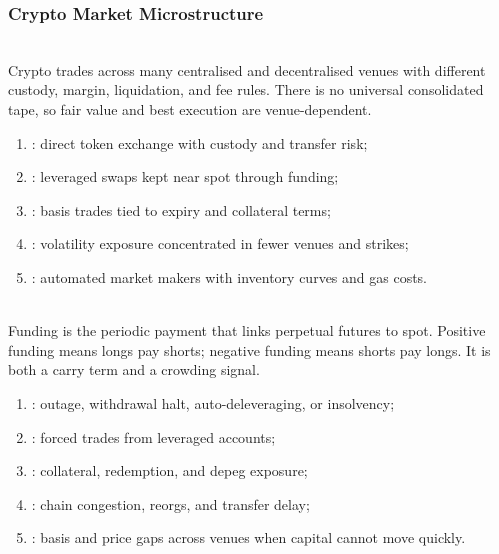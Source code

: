 \subsubsection{Crypto Market Microstructure}

\begin{principle} \\
Crypto trades across many centralised and decentralised venues with different custody, margin, liquidation, and fee rules. There is no universal consolidated tape, so fair value and best execution are venue-dependent.
\end{principle}

\begin{taxonomy} 
\begin{enumerate}[label=\roman*.]
\setlength{\itemsep}{0pt}
\item {}: direct token exchange with custody and transfer risk;
\item {}: leveraged swaps kept near spot through funding;
\item {}: basis trades tied to expiry and collateral terms;
\item {}: volatility exposure concentrated in fewer venues and strikes;
\item {}: automated market makers with inventory curves and gas costs.
\end{enumerate}
\end{taxonomy}

\begin{definition} \\
Funding is the periodic payment that links perpetual futures to spot. Positive funding means longs pay shorts; negative funding means shorts pay longs. It is both a carry term and a crowding signal.
\end{definition}

\begin{taxonomy} 
\begin{enumerate}[label=\roman*.]
\setlength{\itemsep}{0pt}
\item {}: outage, withdrawal halt, auto-deleveraging, or insolvency;
\item {}: forced trades from leveraged accounts;
\item {}: collateral, redemption, and depeg exposure;
\item {}: chain congestion, reorgs, and transfer delay;
\item {}: basis and price gaps across venues when capital cannot move quickly.
\end{enumerate}
\end{taxonomy}
